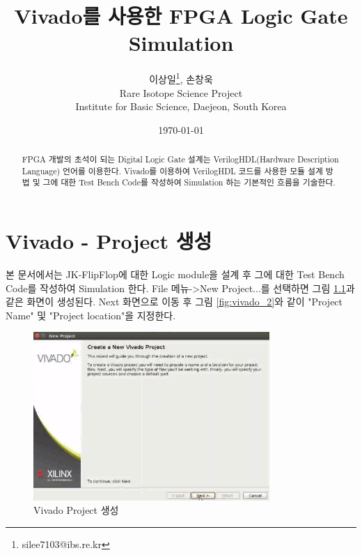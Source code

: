 \documentclass[11pt
  , a4paper
  , article
  , oneside
]{memoir}
\begin{document}
\newcommand{\technumber}{
  RAON Control-Document Series\\
  Revision : v1.0,   Release : 2015-03-16 fixed date}
\title{\textbf{Vivado를 사용한 FPGA Logic Gate Simulation}}

\author{이상일\thanks{silee7103@ibs.re.kr}, 손창욱 \\

  Rare Isotope Science Project\\
  Institute for Basic Science, Daejeon, South Korea
}
\date{\today}
\renewcommand{\maketitlehooka}{\begin{flushright}\textsf{\technumber}\end{flushright}}

\maketitle

\begin{abstract}
FPGA 개발의 초석이 되는 Digital Logic Gate 설계는 VerilogHDL(Hardware Description Language) 언어를 이용한다. Vivado를 이용하여 VerilogHDL 코드를 사용한 모듈 설계 방법 및 그에 대한 Test Bench Code를 작성하여 Simulation 하는 기본적인 흐름을 기술한다.
\end{abstract}

\chapter{Vivado - Project 생성}
 본 문서에서는 JK-FlipFlop에 대한 Logic module을 설계 후 그에 대한 Test Bench Code를 작성하여 Simulation 한다. File 메뉴->New Project...를 선택하면 그림 \ref{fig:vivado_1}과 같은 화면이 생성된다. Next 화면으로 이동 후 그림 \ref{fig:vivado_2}와 같이 "Project Name" 및 "Project location"을 지정한다.

\clearpage

\begin{figure}[h!]
	\centering
	\includegraphics[width=0.8\textwidth, height=0.4\textwidth]{./images/vivado-pro-1.eps}
	\caption{Vivado Project 생성}
	\label{fig:vivado_1} 
\end{figure}
\end{document}
